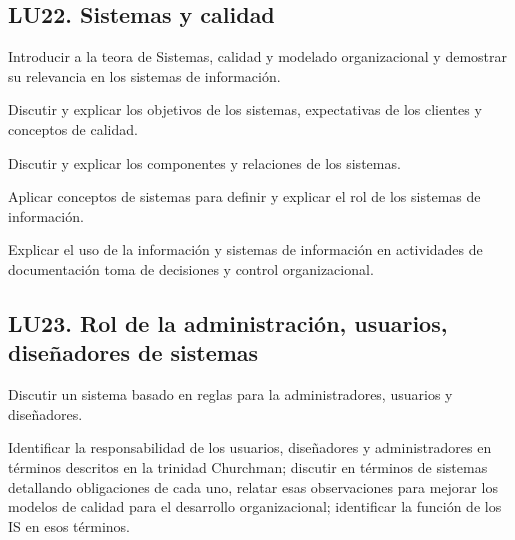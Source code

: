 \subsection{LU22. Sistemas y calidad}\label{sec:LU22}
\begin{LearningUnit}
\begin{LUGoal}
\item Introducir a la teor­a de Sistemas, calidad  y modelado organizacional y demostrar su relevancia en los sistemas de información.
\end{LUGoal}

\begin{LUObjective}
\item Discutir y explicar los objetivos de los sistemas, expectativas de los clientes y conceptos de calidad.
\item Discutir y explicar los componentes y relaciones de los sistemas.
\item Aplicar conceptos de sistemas para definir y explicar el rol de los sistemas de información.
\item Explicar el uso de la información y sistemas de información en actividades de documentación toma de decisiones y control organizacional.
\end{LUObjective}
\end{LearningUnit}

\subsection{LU23. Rol de la administración, usuarios, diseñadores de sistemas}\label{sec:LU23}
\begin{LearningUnit}
\begin{LUGoal}
\item Discutir un sistema basado en reglas para la administradores, usuarios y diseñadores.
\end{LUGoal}

\begin{LUObjective}
\item Identificar la responsabilidad de los usuarios, diseñadores y administradores en términos descritos en la trinidad Churchman;  discutir en términos de sistemas detallando obligaciones de cada uno, relatar esas observaciones para mejorar los modelos de calidad para el desarrollo organizacional; identificar la función de los  IS en esos términos.
\end{LUObjective}
\end{LearningUnit}

